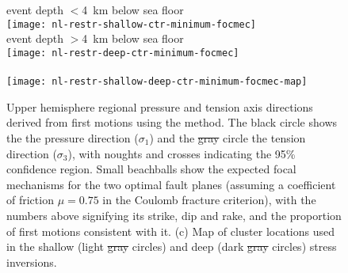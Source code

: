 \documentclass[reviewcopy]{elsart}
\renewcommand{\includegraphics}[2][]{\fbox{#2}}
\providecommand{\DIFadd}[1]{{\protect\color{blue}\uwave{#1}}} %
\providecommand{\DIFdel}[1]{{\protect\color{red}\sout{#1}}}                      %
\providecommand{\DIFaddFL}[1]{\DIFadd{#1}} %
\providecommand{\DIFdelFL}[1]{\DIFdel{#1}} %
\providecommand{\DIFaddbeginFL}{} %
\providecommand{\DIFaddendFL}{} %
\providecommand{\DIFdelbeginFL}{} %
\providecommand{\DIFdelendFL}{} %
\begin{document}
\begin{figure}
\begin{center}
{ event depth $<$4~km below sea floor}\\
\texttt{[image: nl-restr-shallow-ctr-minimum-focmec]}
\\
{ event depth $>$4~km below sea floor}\\
\texttt{[image: nl-restr-deep-ctr-minimum-focmec]}
\\
{ }\\
\texttt{[image: nl-restr-shallow-deep-ctr-minimum-focmec-map]}
\end{center}

\caption{Upper hemisphere regional pressure and tension axis
  directions derived from first motions using the \citet{robinson00}
  method. The black circle shows the the pressure direction
  ($\sigma_1$) and the \DIFdelbeginFL \DIFdelFL{gray }\DIFdelendFL \DIFaddbeginFL \DIFaddFL{grey }\DIFaddendFL circle the tension direction ($\sigma_3$), with noughts and
  crosses indicating the 95\% confidence region. Small beachballs show
 the expected focal mechanisms for the two optimal fault planes
 (assuming a coefficient of friction $\mu=0.75$ in the Coulomb
 fracture criterion), with the numbers above signifying its strike, dip and rake, and the proportion of first motions consistent with
it. (c) Map of cluster locations used in  the shallow (light \DIFdelbeginFL \DIFdelFL{gray
}\DIFdelendFL \DIFaddbeginFL \DIFaddFL{grey
}\DIFaddendFL circles) and deep (dark \DIFdelbeginFL \DIFdelFL{gray }\DIFdelendFL \DIFaddbeginFL \DIFaddFL{grey }\DIFaddendFL circles) stress inversions.}
\label{fig:focmec}
\end{figure}
\end{document}
